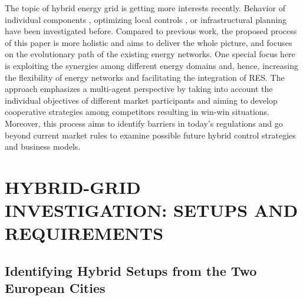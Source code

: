 \documentclass[a4paper,twoside]{article}
\begin{document}

The topic of hybrid energy grid is getting more interests recently. 
Behavior of individual components \cite{keirstead_2012}, optimizing
local controls \cite{etransport}\cite{arnold_2009}, or infrastructural
planning \cite{infraplan} have been investigated before. 
Compared to previous work, the proposed process of this paper is more
holistic and aims to deliver the whole picture, and focuses on the
evolutionary path of the existing energy networks. 
One special focus here is exploiting the synergies among different
energy domains and, hence, increasing the flexibility of energy
networks and facilitating the integration of RES. The approach
emphasizes a multi-agent perspective by taking into account the
individual objectives of different market participants and aiming to
develop cooperative strategies among competitors resulting in win-win 
situations. Moreover, this process aims to identify barriers in
today’s regulations and go beyond current market rules to examine
possible future hybrid control strategies and business models. 

\section{\uppercase{Hybrid-grid Investigation: 
Setups and Requirements}}
\label{sec:req}

\subsection{Identifying Hybrid Setups from the Two European Cities}
\label{sec:req-1}
\end{document}
